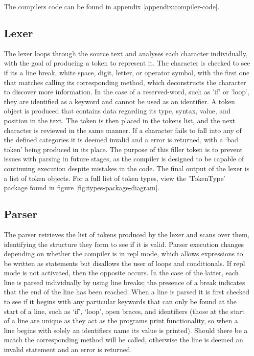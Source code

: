 \documentclass[
]{report}
\begin{document}
The compilers code can be found in appendix \ref{appendix:compiler-code}.

\subsection{Lexer}
The lexer loops through the source text and analyses each character
individually, with the goal of producing a \gls{token} to represent it. The
character is checked to see if its a line break, white space, digit,
letter, or operator \gls{symbol}, with the first one that matches calling its
corresponding method, which deconstructs the character to discover more
information. In the case of a \gls{reserved-word}, such as 'if' or 'loop',
they are identified as a \gls{keyword} and cannot be used as an \gls{identifier}.
A \gls{token} object is produced that contains data regarding its
type, syntax, value, and position in the text. The \gls{token} is then placed
in the \glspl{token} list, and the next character is reviewed in the same
manner. If a character fails to fall into any of the defined categories
it is deemed invalid and a error is returned, with a `bad \gls{token}' being
produced in its place. The purpose of this filler \gls{token} is to prevent
issues with \gls{parsing} in future stages, as the compiler is designed to be
capable of continuing execution despite mistakes in the code. The final
output of the lexer is a list of \gls{token} objects. For a full list of token types,
view the 'TokenType' package found in figure \ref{fig:types-package-diagram}.

\subsection{Parser}
The parser retrieves the list of \glspl{token} produced by the lexer and scans
over them, identifying the structure they form to see if it is valid.
Parser execution changes depending on whether the compiler is in \acrshort{repl}
mode, which allows \glspl{expression} to be written as \glspl{statement} but disallows
the user of loops and conditionals. If \acrshort{repl} mode is not activated, then
the opposite occurs. In the case of the latter, each line is parsed
individually by using line breaks; the presence of a break indicates
that the end of the line has been reached. When a line is parsed it is
first checked to see if it begins with any particular \glspl{keyword} that can
only be found at the start of a line, such as `if', `loop', open braces,
and \glspl{identifier} (those at the start of a line are unique as they act as
the programs print functionality, so when a line begins with solely an
\glspl{identifier} name its value is printed). Should there be a match the
corresponding method will be called, otherwise the line is deemed an
invalid \gls{statement} and an error is returned.
\end{document}
